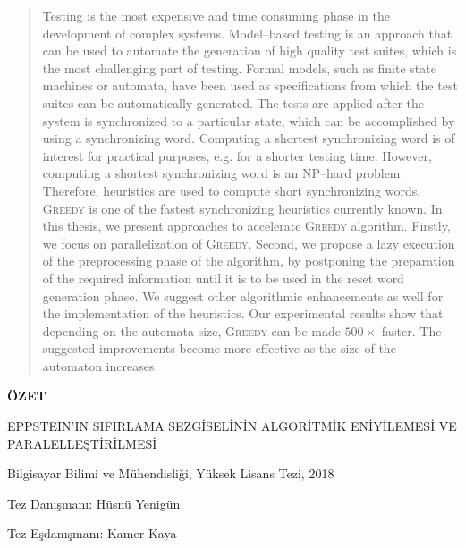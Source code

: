 \documentclass[12pt, a4paper]{report}
\begin{document}
\begin{quote}

\begin{spacing}{1}
Testing is the most expensive and time consuming phase in the development of complex systems. Model--based testing is an approach that can be used to automate the generation of high quality test suites, which is the most challenging part of testing. Formal models, such as finite state machines or automata, have been used as specifications from which the test suites can be automatically generated. The tests are applied after the system is synchronized to a particular state, which can be accomplished by using a synchronizing word.  Computing a shortest synchronizing word is of interest for practical purposes, e.g. for a shorter testing time. However, computing a shortest synchronizing word is an NP--hard problem. Therefore, heuristics are used to compute short synchronizing words. \textsc{Greedy} is one of the fastest synchronizing heuristics currently known. In this thesis, we present approaches to accelerate \textsc{Greedy} algorithm. Firstly, we focus on parallelization of \textsc{Greedy}. Second, we propose a lazy execution of the preprocessing phase of the algorithm, by postponing the preparation of the required information until it is to be used in the reset word generation phase. We suggest other algorithmic enhancements as well for the implementation of the heuristics. Our experimental results show that depending on the automata size, \textsc{Greedy} can be made $500\times$ faster. The suggested improvements become more effective as the size of the automaton increases.
\end{spacing}
\end{quote}

\clearpage

\begin{center}
{\bf ÖZET}
\end{center}

\begin{center}
\large
EPPSTEIN'IN SIFIRLAMA SEZGİSELİNİN ALGORİTMİK ENİYİLEMESİ VE PARALELLEŞTİRİLMESİ
\end{center}

\begin{center}
\MyAuthor

Bilgisayar Bilimi ve Mühendisliği, Yüksek Lisans Tezi, 2018

Tez Danışmanı: Hüsnü Yenigün

Tez Eşdanışmanı: Kamer Kaya
\end{center}
\end{document}
